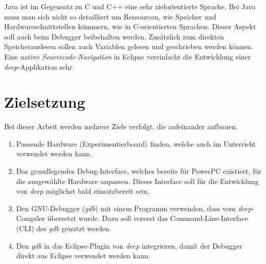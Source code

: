 Java ist im Gegensatz zu C und C++ eine sehr zielorientierte Sprache.
Bei Java muss man sich nicht so detailliert um Ressourcen, wie Speicher und Hardwareschnittstellen kümmern, wie in C-orientierten Sprachen.
Dieser Aspekt soll auch beim Debugger beibehalten werden.
Zusätzlich zum direkten Speicherauslesen sollen auch Variablen gelesen und geschrieben werden können.
Eine native \textit{Sourcecode-Navigation} in Eclipse vereinfacht die Entwicklung einer \textit{deep}-Applikation sehr.



\section{Zielsetzung}
Bei dieser Arbeit werden mehrere Ziele verfolgt, die aufeinander aufbauen.


\begin{enumerate}
\item Passende Hardware (Experimentierboard) finden, welche auch im Unterricht verwendet werden kann.
\item Das grundlegendes Debug-Interface, welches bereits für PowerPC existiert, für die ausgewählte Hardware anpassen. Dieses Interface soll für die Entwicklung von \textit{deep} möglichst bald einsatzbereit sein.
\item Den GNU-Debugger (\textit{gdb}) mit einem Programm verwenden, dass vom \textit{deep}-Compiler übersetzt wurde. Dazu soll vorerst das Command-Line-Interface (CLI) des \textit{gdb} genutzt werden.
\item Den \textit{gdb} in das Eclipse-Plugin von \textit{deep} integrieren, damit der Debugger direkt aus Eclipse verwendet werden kann.
\end{enumerate}








